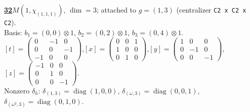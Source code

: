 \begin{samepage}\noindent\textbf{\underline{32}}\quad $M(1,\chi_{(1,1,1)})$, $\dim=3$; attached to $g=(1,3)$ (centralizer \texttt{C2 x C2 x C2}).\\
Basis: $b_{1}=(0,0)\otimes 1$, $b_{2}=(0,2)\otimes 1$, $b_{3}=(0,4)\otimes 1$.\\
$[t]=\left(\begin{smallmatrix} 0 & -1 & 0 \\ 0 & 0 & -1 \\ -1 & 0 & 0 \end{smallmatrix}\right)$,\quad $[x]=\left(\begin{smallmatrix} 0 & 0 & 1 \\ 1 & 0 & 0 \\ 0 & 1 & 0 \end{smallmatrix}\right)$,\quad $[y]=\left(\begin{smallmatrix} 1 & 0 & 0 \\ 0 & -1 & 0 \\ 0 & 0 & -1 \end{smallmatrix}\right)$,\quad $[z]=\left(\begin{smallmatrix} -1 & 0 & 0 \\ 0 & 1 & 0 \\ 0 & 0 & -1 \end{smallmatrix}\right)$.\\
Nonzero $\delta_h$: $\delta_{(1,3)}=\operatorname{diag}(1,0,0)$, $\delta_{(\omega,3)}=\operatorname{diag}(0,0,1)$, $\delta_{(\omega^2,3)}=\operatorname{diag}(0,1,0)$.\end{samepage}
\medskip

